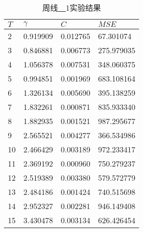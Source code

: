 \begin{table}[ht]
    \centering
    \caption{周线\underline{~~}1实验结果}
    \begin{tabular}{llll}
        \hline
        $T$&  $\gamma$ &         $C$ &     $MSE$ \\
        \hline
         2 &  0.919909 &  0.012765 &   67.301074 \\
         3 &  0.846881 &  0.006773 &  275.979035 \\
         4 &  1.056378 &  0.007531 &  348.060375 \\
         5 &  0.994851 &  0.001969 &  683.108164 \\
         6 &  1.326134 &  0.005690 &  395.138259 \\
         7 &  1.832261 &  0.000871 &  835.933340 \\
         8 &  1.882935 &  0.001521 &  987.295677 \\
         9 &  2.565521 &  0.004277 &  366.534986 \\
        10 &  2.466429 &  0.003189 &  972.233417 \\
        11 &  2.369192 &  0.000960 &  750.279237 \\
        12 &  2.519389 &  0.003380 &  579.572779 \\
        13 &  2.484186 &  0.001424 &  740.515698 \\
        14 &  2.952327 &  0.002281 &  946.149408 \\
        15 &  3.430478 &  0.003134 &  626.426454 \\
        \hline
    \end{tabular}
\end{table}

